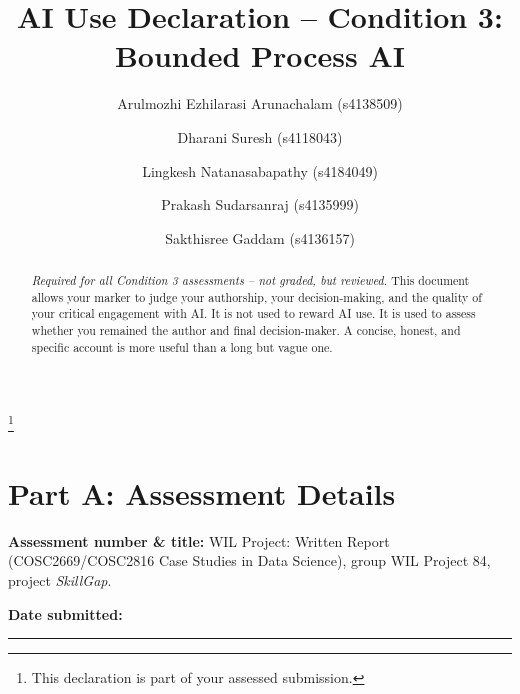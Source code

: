 \documentclass[manuscript,screen,nonacm]{acmart}
\begin{document}
\title{AI Use Declaration -- Condition 3: Bounded Process AI}
\thanks{This declaration is part of your assessed submission.}

\begin{abstract}
\begin{tcolorbox}[colback=blue!05,colframe=black,]
\emph{Required for all Condition 3 assessments -- not graded, but reviewed.}
This document allows your marker to judge your authorship, your decision-making, and the quality of your critical engagement with AI. It is not used to reward AI use. It is used to assess whether you remained the author and final decision-maker. A concise, honest, and specific account is more useful than a long but vague one.
\end{tcolorbox}
\end{abstract}

\author{Arulmozhi Ezhilarasi Arunachalam (s4138509)}
\author{Dharani Suresh (s4118043)}
\author{Lingkesh Natanasabapathy (s4184049)}
\author{Prakash Sudarsanraj (s4135999)}
\author{Sakthisree Gaddam (s4136157)}
\renewcommand{\shortauthors}{WIL Project 84}

\maketitle

\section*{Part A: Assessment Details}

\noindent\textbf{Assessment number \& title:} WIL Project: Written Report (COSC2669/COSC2816 Case Studies in Data Science), group WIL Project 84, project \emph{SkillGap}.

\vspace{1em}
\noindent\textbf{Date submitted:} \hspace{1em} \rule{4cm}{0.4pt}
\end{document}
